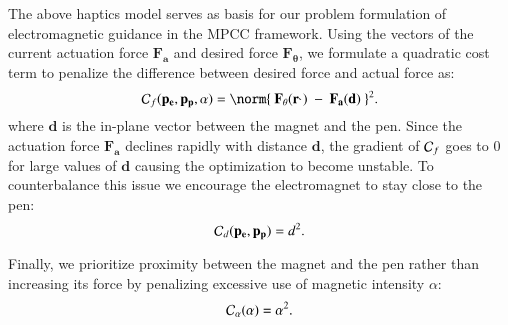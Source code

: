 The above haptics model serves as basis for our problem formulation of electromagnetic guidance in the MPCC framework.
Using the vectors of the current actuation force $\mathbf{F_a}$ and desired force $\mathbf{F_\theta}$, we formulate a quadratic cost term to penalize the difference between desired force and actual force as:
\begin{equation}\label{eq:err_F}
    \Cost_f(\posm, \posp, \alpha) = \norm{ \ \mathbf{F}_{\theta}(\Rtheta) \ - \ \mathbf{F_a}(\mathbf{d}) \ }^2. 
    \end{equation}
%
where $\mathbf{d}$ is the in-plane vector between the magnet and the pen.
Since the actuation force $\mathbf{F_a}$ declines rapidly with distance $\mathbf{d}$, the gradient of $\mathcal{C}_f$ goes to 0 for large values of $\mathbf{d}$ causing the optimization to become unstable. 
To counterbalance this issue we encourage the electromagnet to stay close to the pen:
\begin{equation}
    \mathcal{C}_d(\mathbf{p_e},\mathbf{p_p}) = d^2. \label{eq:err_d}
\end{equation}

Finally, we prioritize proximity between the magnet and the pen rather than increasing its force by penalizing excessive use of magnetic intensity $\alpha$:
\begin{equation}
    \mathcal{C}_{\alpha}(\alpha) = \alpha^2. \label{eq:err_alpha}
\end{equation}
%
%
